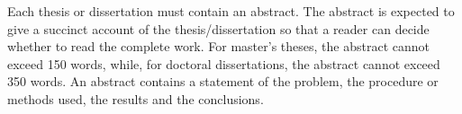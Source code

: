 Each thesis or dissertation must contain an abstract. The abstract is expected to give a succinct account of the thesis/dissertation so that a reader can decide whether to read the complete work. For master’s theses, the abstract cannot exceed 150 words, while, for doctoral dissertations, the abstract cannot exceed 350 words. An abstract contains a statement of the problem, the procedure or methods used, the results and the conclusions.